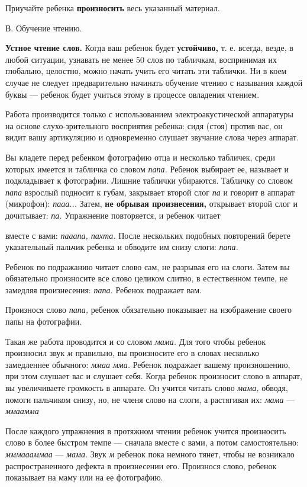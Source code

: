 \documentclass{book}
\renewcommand{\emph}[1]{\textit{#1}}
\begin{document}
Приучайте ребенка \textbf{произносить} весь указанный материал.

В. Обучение чтению.

\textbf{Устное чтение слов.} Когда ваш ребенок будет \textbf{устойчиво,}
т. е. всегда, везде, в любой ситуации, узнавать не менее 50 слов по
табличкам, воспринимая их глобально, целостно, можно начать учить его
читать эти таблички. Ни в коем случае не следует предварительно начинать
обучение чтению с называния каждой буквы --- ребенок будет учиться этому
в процессе овладения чтением.

Работа производится только с использованием электроакустической
аппаратуры на основе слухо-зрительного восприятия ребенка: сидя (стоя)
против вас, он видит вашу артикуляцию и одновременно слушает звучание
слова через аппарат.

Вы кладете перед ребенком фотографию отца и несколько табличек, среди
которых имеется и табличка со словом \emph{папа.} Ребенок выбирает ее,
называет и подкладывает к фотографии. Лишние таблички убираются.
Табличку со словом \emph{папа} взрослый подносит к губам, закрывает
второй слог \emph{па} и говорит в аппарат (микрофон): \emph{пааа...}
Затем, \textbf{не обрывая произнесения,} открывает второй слог и
дочитывает: \emph{па.} Упражнение повторяется, и ребенок читает

вместе с вами: \emph{пааапа, пахта.} После нескольких подобных
повторений берете указательный пальчик ребенка и обводите им снизу
слоги: \emph{папа.}

Ребенок по подражанию читает слово сам, не разрывая его на слоги. Затем
вы обязательно произносите все слово целиком слитно, в естественном
темпе, не замедляя произнесения: \emph{папа.} Ребенок подражает вам.

Произнося слово \emph{папа,} ребенок обязательно показывает на
изображение своего папы на фотографии.

Такая же работа проводится и со словом \emph{мама.} Для того чтобы
ребенок произносил звук \emph{м} правильно, вы произносите его в словах
несколько замедленнее обычного: \emph{ммаа мма.} Ребенок подражает
вашему произношению, при этом слушает вас и слушает себя. Когда ребенок
произносит слово в аппарат, вы увеличиваете громкость в аппарате. Он
учится читать слово \emph{мама,} обводя, помоги пальчиком снизу, но, не
членя слово на слоги, а растягивая их: \emph{мама} --- \emph{ммаамма}

После каждого упражнения в протяжном чтении ребенок учится произносить
слово в более быстром темпе --- сначала вместе с вами, а потом
самостоятельно: \emph{мммаааммаа} --- \emph{мама.} Звук \emph{м} ребенок
пока немного тянет, чтобы не возникало распространенного дефекта в
произнесении его. Произнося слово, ребенок показывает на маму или на ее
фотографию.
\end{document}
